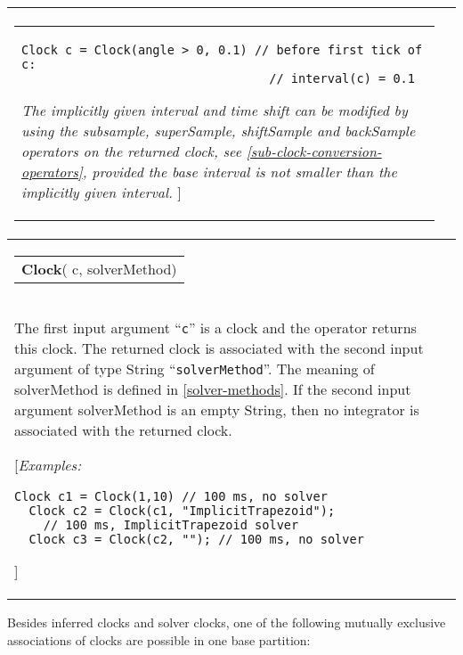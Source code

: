 \begin{longtable}[]{|p{3cm}|p{12cm}|}
\begin{tabular}{@{}p{119mm}@{}}
\begin{lstlisting}[language=modelica]
  Clock c = Clock(angle > 0, 0.1) // before first tick of c:
                                  // interval(c) = 0.1
\end{lstlisting}

\emph{The implicitly given interval and time shift can be modified by
using the subsample, superSample, shiftSample and backSample operators
on the returned clock, see \autoref{sub-clock-conversion-operators}, provided the base
interval is not smaller than the implicitly given interval.} {]}
\end{tabular}\\ \hline
\begin{tabular}{@{}p{29mm}@{}}
\textbf{Clock}(\newline
 c,\newline
 solverMethod)\newline
\end{tabular}
&
\begin{tabular}{@{}p{119mm}@{}}
\textbf{Solver Clock}\\

The first input argument ``\lstinline[basicstyle=\ttfamily]!c!'' is a clock and the operator returns this
clock. The returned clock is associated with the second input argument
of type String ``\lstinline[basicstyle=\ttfamily]!solverMethod!''. The meaning of solverMethod is defined
in \autoref{solver-methods}. If the second input argument solverMethod is an empty
String, then no integrator is associated with the returned clock.

{[}\emph{Examples:}
\begin{lstlisting}[language=modelica]
  Clock c1 = Clock(1,10) // 100 ms, no solver
  Clock c2 = Clock(c1, "ImplicitTrapezoid"); 
    // 100 ms, ImplicitTrapezoid solver 
  Clock c3 = Clock(c2, ""); // 100 ms, no solver
\end{lstlisting}
{]}\strut
\end{tabular}
\\ \hline

\end{longtable}

Besides inferred clocks and solver clocks, one of the following mutually
exclusive associations of clocks are possible in one base partition:

